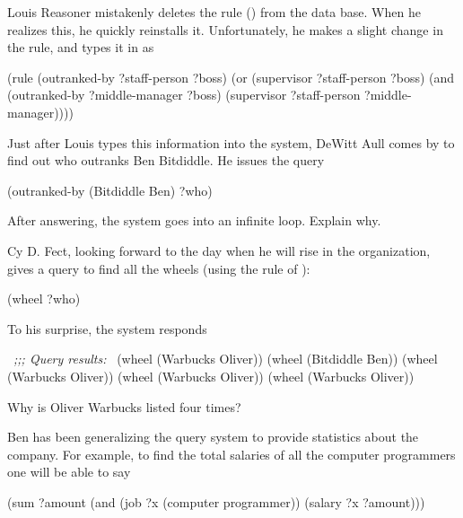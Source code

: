 \begin{exerciseGroup}
\label{Exercise 4.64}
 Louis Reasoner mistakenly deletes
the  rule () from the data base.  When he
realizes this, he quickly reinstalls it.  Unfortunately, he makes a slight
change in the rule, and types it in as

\begin{codeBlock}
(rule (outranked-by ?staff-person ?boss)
      (or (supervisor ?staff-person ?boss)
          (and (outranked-by ?middle-manager ?boss)
               (supervisor ?staff-person
                           ?middle-manager))))
\end{codeBlock}

Just after Louis types this information into the system, DeWitt Aull comes by
to find out who outranks Ben Bitdiddle. He issues the query

\begin{codeBlock}
(outranked-by (Bitdiddle Ben) ?who)
\end{codeBlock}

After answering, the system goes into an infinite loop.  Explain why.

\label{Exercise 4.65}
 Cy D. Fect, looking forward to
the day when he will rise in the organization, gives a query to find all the
wheels (using the  rule of ):

\begin{codeBlock}
(wheel ?who)
\end{codeBlock}

To his surprise, the system responds

\begin{codeBlock}
~\textit{;;; Query results:}~
(wheel (Warbucks Oliver))
(wheel (Bitdiddle Ben))
(wheel (Warbucks Oliver))
(wheel (Warbucks Oliver))
(wheel (Warbucks Oliver))
\end{codeBlock}

Why is Oliver Warbucks listed four times?

\label{Exercise 4.66}
 Ben has been generalizing the
query system to provide statistics about the company.  For example, to find the
total salaries of all the computer programmers one will be able to say

\begin{codeBlock}
(sum ?amount (and (job ?x (computer programmer))
                  (salary ?x ?amount)))
\end{codeBlock}


\end{exerciseGroup}

